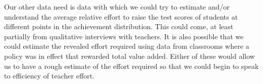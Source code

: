 \documentclass[letterpaper,12pt]{article}
\begin{document}
Our other data need is data with which we could try to estimate and/or understand the average relative effort to raise the test scores of students at different points in the achievement distribution. This could come, at least partially from qualitative interviews with teachers. It is also possible that we could estimate the revealed effort required using data from classrooms where a policy was in effect that rewarded total value added. Either of these would allow us to have a rough estimate of the effort required so that we could begin to speak to efficiency of teacher effort.




    
\end{document}
